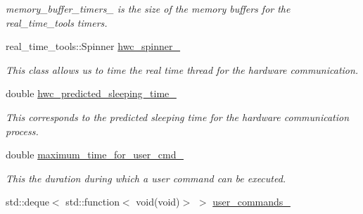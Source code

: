 \begin{DoxyCompactItemize}
\begin{DoxyCompactList}\small\item\em memory\+\_\+buffer\+\_\+timers\+\_\+ is the size of the memory buffers for the real\+\_\+time\+\_\+tools timers. \end{DoxyCompactList}\item 
real\+\_\+time\+\_\+tools\+::\+Spinner \hyperlink{classdynamic__graph_1_1DynamicGraphManager_ab4716c8ec6194816235e6199863f46f9}{hwc\+\_\+spinner\+\_\+}\hypertarget{classdynamic__graph_1_1DynamicGraphManager_ab4716c8ec6194816235e6199863f46f9}{}\label{classdynamic__graph_1_1DynamicGraphManager_ab4716c8ec6194816235e6199863f46f9}

\begin{DoxyCompactList}\small\item\em This class allows us to time the real time thread for the hardware communication. \end{DoxyCompactList}\item 
double \hyperlink{classdynamic__graph_1_1DynamicGraphManager_af5aa11023c1dd272d7bbabdcccc511b6}{hwc\+\_\+predicted\+\_\+sleeping\+\_\+time\+\_\+}
\begin{DoxyCompactList}\small\item\em This corresponds to the predicted sleeping time for the hardware communication process. \end{DoxyCompactList}\item 
double \hyperlink{classdynamic__graph_1_1DynamicGraphManager_abb979a3e9235ef71a61579a6a6ad1200}{maximum\+\_\+time\+\_\+for\+\_\+user\+\_\+cmd\+\_\+}\hypertarget{classdynamic__graph_1_1DynamicGraphManager_abb979a3e9235ef71a61579a6a6ad1200}{}\label{classdynamic__graph_1_1DynamicGraphManager_abb979a3e9235ef71a61579a6a6ad1200}

\begin{DoxyCompactList}\small\item\em This the duration during which a user command can be executed. \end{DoxyCompactList}\item 
std\+::deque$<$ std\+::function$<$ void(void)$>$ $>$ \hyperlink{classdynamic__graph_1_1DynamicGraphManager_a1a07b4003cc1a0021e675847cc57ef5c}{user\+\_\+commands\+\_\+}\hypertarget{classdynamic__graph_1_1DynamicGraphManager_a1a07b4003cc1a0021e675847cc57ef5c}{}\label{classdynamic__graph_1_1DynamicGraphManager_a1a07b4003cc1a0021e675847cc57ef5c}


\end{DoxyCompactItemize}
